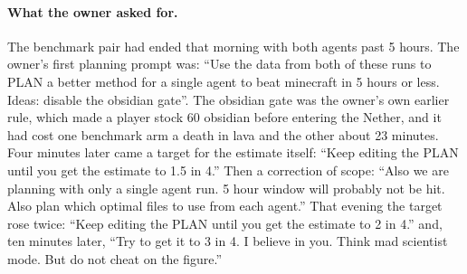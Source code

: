 \documentclass[11pt,a4paper]{article}
\begin{document}
\paragraph{What the owner asked for.} The benchmark pair had ended that morning with both agents past 5 hours. The owner's first planning prompt was: ``Use the data from both of these runs to PLAN a better method for a single agent to beat minecraft in 5 hours or less. Ideas: disable the obsidian gate''. The obsidian gate was the owner's own earlier rule, which made a player stock 60 obsidian before entering the Nether, and it had cost one benchmark arm a death in lava and the other about 23 minutes. Four minutes later came a target for the estimate itself: ``Keep editing the PLAN until you get the estimate to 1.5 in 4.'' Then a correction of scope: ``Also we are planning with only a single agent run. 5 hour window will probably not be hit. Also plan which optimal files to use from each agent.'' That evening the target rose twice: ``Keep editing the PLAN until you get the estimate to 2 in 4.'' and, ten minutes later, ``Try to get it to 3 in 4. I believe in you. Think mad scientist mode. But do not cheat on the figure.''
\end{document}
